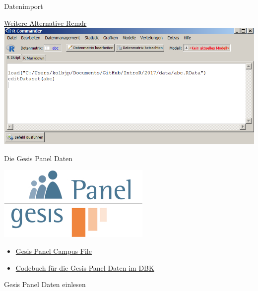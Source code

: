 \documentclass[ignorenonframetext,]{beamer}
\newenvironment{Shaded}{}{}
\newcommand{\KeywordTok}[1]{\textcolor[rgb]{0.00,0.44,0.13}{\textbf{{#1}}}}
\newcommand{\StringTok}[1]{\textcolor[rgb]{0.25,0.44,0.63}{{#1}}}
\newcommand{\NormalTok}[1]{{#1}}
\begin{document}
\begin{frame}[fragile]{Datenimport}
\begin{block}{\href{https://cran.r-project.org/web/packages/Rcmdr/index.html}{Weitere
Alternative Rcmdr}}
\includegraphics{./tex2pdf.9796/7fc6300bc58e78aaaf7433492aaeaa8d1319075c.png}

\end{block}

\begin{block}{Die Gesis Panel Daten}

\includegraphics{./tex2pdf.9796/5e78f32f301eb9cbc23cee28d482621ebc199870.jpg}

\begin{itemize}
\item
  \href{http://www.gesis.org/gesis-panel/data/gesis-panel-campus-file/}{Gesis
  Panel Campus File}
\item
  \href{https://dbk.gesis.org/dbksearch/SDesc2.asp?ll=10\&notabs=\&af=\&nf=\&search=gesis\%20panel\&search2=\&db=D\&no=5665}{Codebuch
  für die Gesis Panel Daten im DBK}
\end{itemize}

\end{block}

\begin{block}{Gesis Panel Daten einlesen}

\begin{Shaded}
\end{Shaded}


\end{block}
\end{frame}
\end{document}
